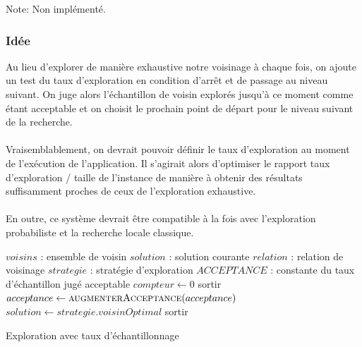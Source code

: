 \documentclass[a4paper,10pt]{report}
\begin{document}
Note: Non implémenté.

\subsubsection{Idée}
  Au lieu d'explorer de manière exhaustive notre voisinage à chaque fois, on
ajoute un test du taux d'exploration en condition d'arrêt et de passage au
niveau suivant. On juge alors l'échantillon de voisin explorés jusqu'à ce moment
comme étant acceptable et on choisit le prochain point de départ pour le niveau
suivant de la recherche.

\paragraph{}
  Vraisemblablement, on devrait pouvoir définir le taux d'exploration au moment
de l'exécution de l'application. Il s'agirait alors d'optimiser le rapport taux
d'exploration / taille de l'instance de manière à obtenir des résultats
suffisamment proches de ceux de l'exploration exhaustive.

\paragraph{}
  En outre, ce système devrait être compatible à la fois avec l'exploration
probabiliste et la recherche locale classique.

\begin{algorithm}[H]
  \begin{algorithmic}
    \Require $voisins$ : ensemble de voisin
    \Require $solution$ : solution courante
    \Require $relation$ : relation de voisinage
    \Require $strategie$ : stratégie d'exploration
    \Require $ACCEPTANCE$ : constante du taux d'échantillon jugé acceptable
    \State
      \State $compteur \gets 0$
	\State {}
	  \State sortir
	\Else
	  \State $acceptance \gets \Call{augmenterAcceptance}{acceptance}$
	\EndIf
      \EndFor
	\State $solution \gets strategie.voisinOptimal$
      \Else
	\State sortir
      \EndIf
    \EndWhile
  \end{algorithmic}
  \caption{Exploration avec taux d'échantillonnage}
\end{algorithm}
\end{document}
